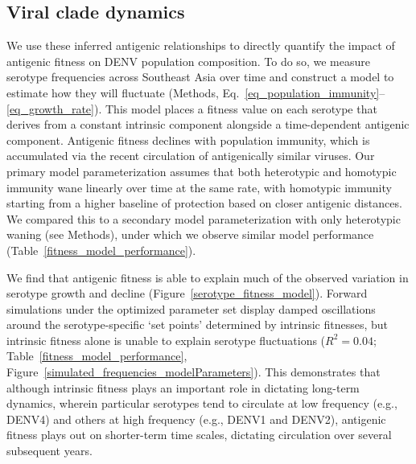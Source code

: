 \documentclass[11pt,oneside,letterpaper]{article}
\begin{document}
\subsection*{Viral clade dynamics}
We use these inferred antigenic relationships to directly quantify the impact of antigenic fitness on DENV population composition.
To do so, we measure serotype frequencies across Southeast Asia over time and construct a model to estimate how they will fluctuate (Methods, Eq.~\ref{eq_population_immunity}--\ref{eq_growth_rate}).
This model places a fitness value on each serotype that derives from a constant intrinsic component alongside a time-dependent antigenic component.
Antigenic fitness declines with population immunity, which is accumulated via the recent circulation of antigenically similar viruses.
Our primary model parameterization assumes that both heterotypic and homotypic immunity wane linearly over time at the same rate, with homotypic immunity starting from a higher baseline of protection based on closer antigenic distances.
We compared this to a secondary model parameterization with only heterotypic waning (see Methods), under which we observe similar model performance (Table~\ref{fitness_model_performance}).

We find that antigenic fitness is able to explain much of the observed variation in serotype growth and decline (Figure~\ref{serotype_fitness_model}).
Forward simulations under the optimized parameter set display damped oscillations around the serotype-specific `set points' determined by intrinsic fitnesses, but intrinsic fitness alone is unable to explain serotype fluctuations ($R^2=0.04$; Table~\ref{fitness_model_performance}, Figure~\ref{simulated_frequencies_modelParameters}).
This demonstrates that although intrinsic fitness plays an important role in dictating long-term dynamics, wherein particular serotypes tend to circulate at low frequency (e.g., DENV4) and others at high frequency (e.g., DENV1 and DENV2),  antigenic fitness plays out on shorter-term time scales, dictating circulation over several subsequent years.
\end{document}
